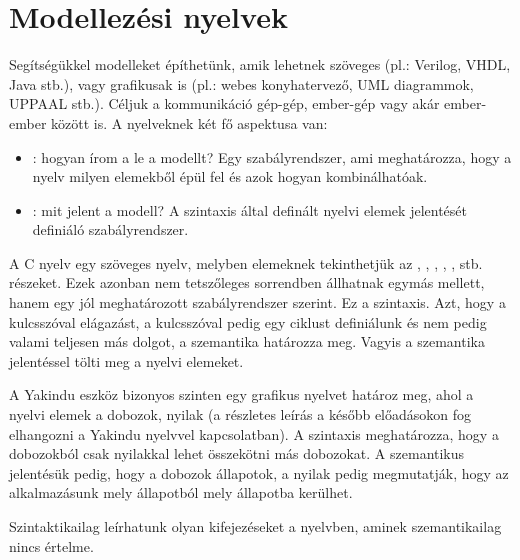 \section{Modellezési nyelvek}

Segítségükkel modelleket építhetünk, amik lehetnek szöveges (pl.: Verilog, VHDL, Java stb.), vagy grafikusak is (pl.: webes konyhatervező, UML diagrammok, UPPAAL stb.). Céljuk a kommunikáció gép-gép, ember-gép vagy akár ember-ember között is. A nyelveknek két fő aspektusa van:

\begin{itemize}
	\item {}: hogyan írom a le a modellt? Egy szabályrendszer, ami meghatározza, hogy a nyelv milyen elemekből épül fel és azok hogyan kombinálhatóak.
	\item {}: mit jelent a modell? A szintaxis által definált nyelvi elemek jelentését definiáló szabályrendszer.
\end{itemize}

\begin{megjegyzes}
	A C nyelv egy szöveges nyelv, melyben elemeknek tekinthetjük az , , , , ,  stb. részeket. Ezek azonban nem tetszőleges sorrendben állhatnak egymás mellett, hanem egy jól meghatározott szabályrendszer szerint. Ez a szintaxis. Azt, hogy a  kulcsszóval elágazást, a  kulcsszóval pedig egy ciklust definiálunk és nem pedig valami teljesen más dolgot, a szemantika határozza meg. Vagyis a szemantika jelentéssel tölti meg a nyelvi elemeket.
\end{megjegyzes}

\begin{megjegyzes}
	A Yakindu eszköz bizonyos szinten egy grafikus nyelvet határoz meg, ahol a nyelvi elemek a dobozok, nyilak (a részletes leírás a később előadásokon fog elhangozni a Yakindu nyelvvel kapcsolatban). A szintaxis meghatározza, hogy a dobozokból csak nyilakkal lehet összekötni más dobozokat. A szemantikus jelentésük pedig, hogy a dobozok állapotok, a nyilak pedig megmutatják, hogy az alkalmazásunk mely állapotból mely állapotba kerülhet.
\end{megjegyzes}

\begin{megjegyzes}
	Szintaktikailag leírhatunk olyan kifejezéseket a nyelvben, aminek szemantikailag nincs értelme.	
\end{megjegyzes}


